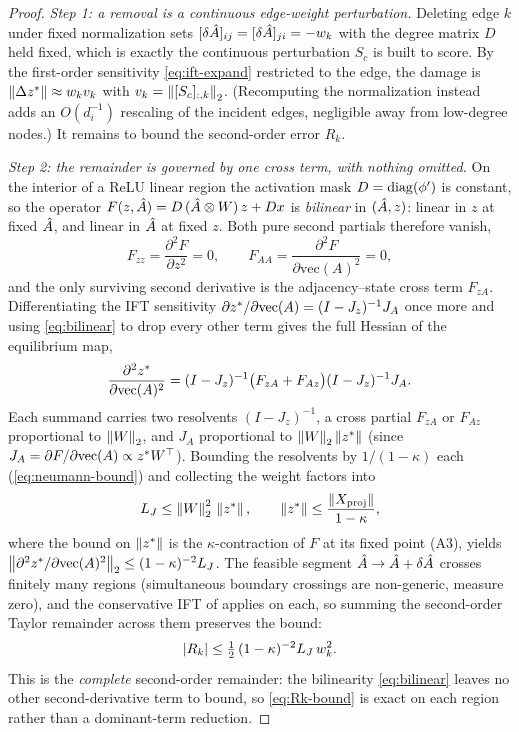 \begin{proof}
\emph{Step 1: a removal is a continuous edge-weight perturbation.}
Deleting edge $k$ under fixed normalization sets $[\delta\hat{A}]_{ij}=[\delta\hat{A}]_{ji}=-w_k$ with the
degree matrix $D$ held fixed, which is exactly the continuous perturbation $S_c$ is built to score. By
the first-order sensitivity \eqref{eq:ift-expand} restricted to the edge, the damage is
$\left\|\Delta z^{*}\right\|\approx w_k v_k$ with $v_k=\left\|[S_c]_{:,k}\right\|_2$. (Recomputing the normalization
instead adds an $O(d_i^{-1})$ rescaling of the incident edges, negligible away from low-degree nodes.)
It remains to bound the second-order error $R_k$.

\emph{Step 2: the remainder is governed by one cross term, with nothing omitted.}
On the interior of a ReLU linear region the activation mask $D=\operatorname{diag}(\phi')$ is constant, so the operator
$F(z,\hat{A})=D\,(\hat{A}\otimes W)\,z+Dx$ is \emph{bilinear} in $(\hat{A},z)$: linear in $z$ at fixed
$\hat{A}$, and linear in $\hat{A}$ at fixed $z$. Both pure second partials therefore vanish,
\begin{equation}
F_{zz}=\frac{\partial^2 F}{\partial z^2}=0,\qquad
F_{AA}=\frac{\partial^2 F}{\partial\mathrm{vec}(A)^2}=0,
\label{eq:bilinear}
\end{equation}
and the only surviving second derivative is the adjacency--state cross term $F_{zA}$. Differentiating
the IFT sensitivity $\partial z^{*}/\partial\mathrm{vec}(A)=(I-J_z)^{-1}J_A$ once more and using
\eqref{eq:bilinear} to drop every other term gives the full Hessian of the equilibrium map,
\begin{equation}
\frac{\partial^2z^{*}}{\partial\mathrm{vec}(A)^2}
=(I-J_z)^{-1}\big(F_{zA}+F_{Az}\big)(I-J_z)^{-1}J_A.
\label{eq:hessian-full}
\end{equation}
Each summand carries two resolvents $(I-J_z)^{-1}$, a cross partial $F_{zA}$ or $F_{Az}$ proportional to
$\left\|W\right\|_2$, and $J_A$ proportional to $\left\|W\right\|_2\left\|z^{*}\right\|$ (since
$J_A=\partial F/\partial\mathrm{vec}(A)\propto z^{*} W^\top$). Bounding the resolvents by $1/(1-\kappa)$
each (\cref{eq:neumann-bound}) and collecting the weight factors into
\begin{equation}
L_J\le\left\|W\right\|_2^2\,\left\|z^{*}\right\|,\qquad \left\|z^{*}\right\|\le\frac{\left\|X_{\mathrm{proj}}\right\|}{1-\kappa},
\label{eq:LJ-bound}
\end{equation}
where the bound on $\left\|z^{*}\right\|$ is the $\kappa$-contraction of $F$ at its fixed point (A3), yields
$\left\|\partial^2z^{*}/\partial\mathrm{vec}(A)^2\right\|_2\le(1-\kappa)^{-2}L_J$. The feasible segment
$\hat{A}\to\hat{A}+\delta\hat{A}$ crosses finitely many regions (simultaneous boundary crossings are
non-generic, measure zero), and the conservative IFT of \citet{bolte2021conservative} applies on each,
so summing the second-order Taylor remainder across them preserves the bound:
\begin{equation}
\left|R_k\right|\le\tfrac12\,(1-\kappa)^{-2}L_J\,w_k^2.
\label{eq:Rk-bound}
\end{equation}
This is the \emph{complete} second-order remainder: the bilinearity \eqref{eq:bilinear} leaves no other
second-derivative term to bound, so \eqref{eq:Rk-bound} is exact on each region rather than a
dominant-term reduction.


\end{proof}
